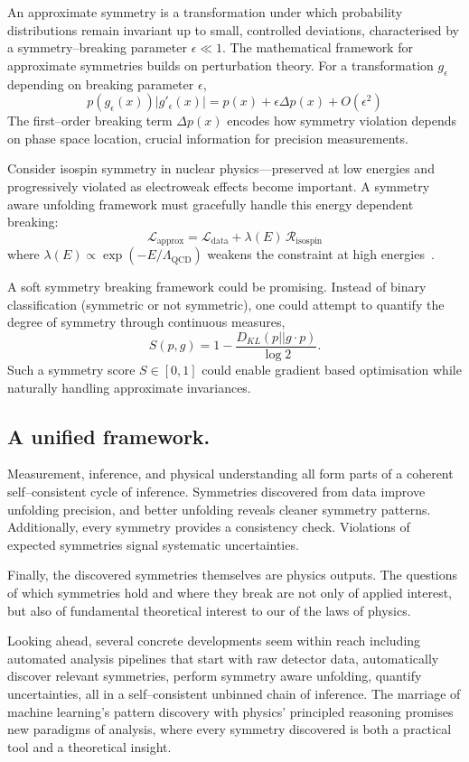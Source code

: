         An approximate symmetry is a transformation under which probability distributions remain invariant up to small, controlled deviations, characterised by a symmetry--breaking parameter \(\epsilon \ll 1\).
        The mathematical framework for approximate symmetries builds on perturbation theory.
        For a transformation \(g_\epsilon\) depending on breaking parameter \(\epsilon\),
        \[
            p(g_\epsilon(x)) |g'_\epsilon(x)| = p(x) + \epsilon \Delta p(x) + O(\epsilon^2)
        \]
        The first--order breaking term \(\Delta p(x)\) encodes how symmetry violation depends on phase space location, crucial information for precision measurements.
    
        Consider isospin symmetry in nuclear physics---preserved at low energies and progressively violated as electroweak effects become important.
        A symmetry aware unfolding framework must gracefully handle this energy dependent breaking:
        \[
            \mathcal{L}_{\text{approx}} = \mathcal{L}_{\text{data}} + \lambda(E) \,\mathcal{R}_{\text{isospin}}
        \]
        where \(\lambda(E) \propto \exp(-E/\Lambda_{\text{QCD}})\) weakens the constraint at high energies~\cite{Chreim:2023tvs}.
    
        A soft symmetry breaking framework could be promising.
        Instead of binary classification (symmetric or not symmetric), one could attempt to quantify the degree of symmetry through continuous measures,
        \[
            S(p, g) = 1 - \frac{D_{KL}(p || g \cdot p)}{\log 2}.
        \]
        Such a symmetry score \(S \in [0,1]\) could enable gradient based optimisation while naturally handling approximate invariances.
    
    \subsection{A unified framework.}
        Measurement, inference, and physical understanding all form parts of a coherent self--consistent cycle of inference.
        Symmetries discovered from data improve unfolding precision, and better unfolding reveals cleaner symmetry patterns.
        Additionally, every symmetry provides a consistency check.
        Violations of expected symmetries signal systematic uncertainties.
        
        Finally, the discovered symmetries themselves are physics outputs.
        The questions of which symmetries hold and where they break are not only of applied interest, but also of fundamental theoretical interest to our of the laws of physics.
    
        Looking ahead, several concrete developments seem within reach including automated analysis pipelines that start with raw detector data, automatically discover relevant symmetries, perform symmetry aware unfolding, quantify uncertainties, all in a self--consistent unbinned chain of inference.
        The marriage of machine learning's pattern discovery with physics' principled reasoning promises new paradigms of analysis, where every symmetry discovered is both a practical tool and a theoretical insight.
